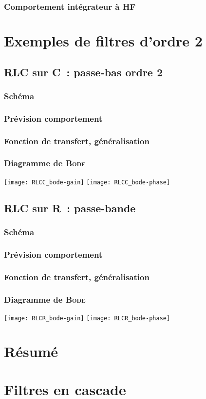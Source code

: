 \documentclass[../main/main.tex]{subfiles}
\begin{document}
\subsubsection{Comportement intégrateur à HF}

\section{Exemples de filtres d'ordre 2}
\subsection{RLC sur C~: passe-bas ordre 2}
\subsubsection{Schéma}
\subsubsection{Prévision comportement}
\subsubsection{Fonction de transfert, généralisation}
\subsubsection{Diagramme de \textsc{Bode}}
\begin{center}
    \texttt{[image: RLCC\_bode-gain]}
    \texttt{[image: RLCC\_bode-phase]}
\end{center}

\subsection{RLC sur R~: passe-bande}
\subsubsection{Schéma}
\subsubsection{Prévision comportement}
\subsubsection{Fonction de transfert, généralisation}
\subsubsection{Diagramme de \textsc{Bode}}
\begin{center}
    \texttt{[image: RLCR\_bode-gain]}
    \texttt{[image: RLCR\_bode-phase]}
\end{center}

\section{Résumé}

\section{Filtres en cascade}
\end{document}
